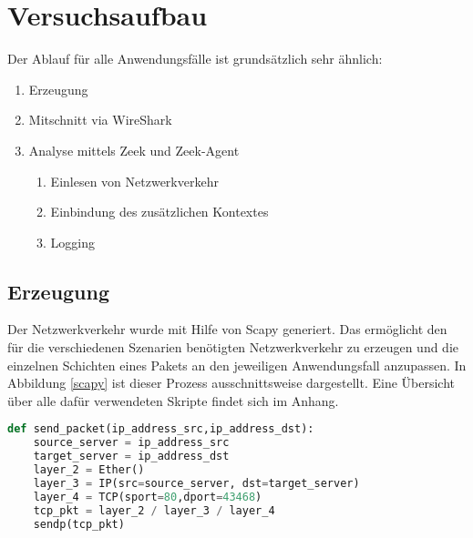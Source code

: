 \section{Versuchsaufbau}
Der Ablauf für alle Anwendungsfälle ist grundsätzlich sehr ähnlich:
\begin{enumerate}
\item{Erzeugung}
\item{Mitschnitt via WireShark}
\item{Analyse mittels Zeek und Zeek-Agent}
\begin{enumerate}
\item{Einlesen von Netzwerkverkehr}
\item{Einbindung des zusätzlichen Kontextes}
\item{Logging}
\end{enumerate}
\end{enumerate}
\subsection{Erzeugung}
Der Netzwerkverkehr wurde mit Hilfe von Scapy generiert. Das ermöglicht den für die verschiedenen Szenarien benötigten Netzwerkverkehr zu erzeugen und die einzelnen Schichten eines Pakets an den jeweiligen Anwendungsfall anzupassen. In Abbildung \ref{scapy} ist dieser Prozess ausschnittsweise dargestellt. Eine Übersicht über alle dafür verwendeten Skripte findet sich im Anhang.
\begin{lstlisting}[label={scapy},language=python,caption={Konfiguration und Versendung eines Pakets},firstnumber=6]
def send_packet(ip_address_src,ip_address_dst):
    source_server = ip_address_src
    target_server = ip_address_dst
    layer_2 = Ether()
    layer_3 = IP(src=source_server, dst=target_server)
    layer_4 = TCP(sport=80,dport=43468)
    tcp_pkt = layer_2 / layer_3 / layer_4
    sendp(tcp_pkt)
\end{lstlisting}



